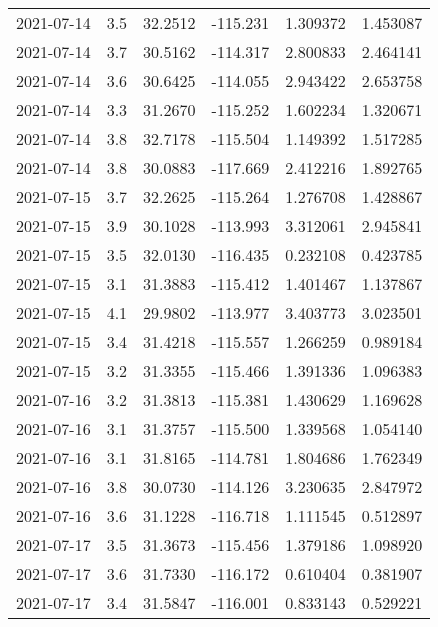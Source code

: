 \begin{tabular}{lrrrrr}
2021-07-14 &       3.5 &  32.2512 &  -115.231 &         1.309372 &         1.453087 \\
2021-07-14 &       3.7 &  30.5162 &  -114.317 &         2.800833 &         2.464141 \\
2021-07-14 &       3.6 &  30.6425 &  -114.055 &         2.943422 &         2.653758 \\
2021-07-14 &       3.3 &  31.2670 &  -115.252 &         1.602234 &         1.320671 \\
2021-07-14 &       3.8 &  32.7178 &  -115.504 &         1.149392 &         1.517285 \\
2021-07-14 &       3.8 &  30.0883 &  -117.669 &         2.412216 &         1.892765 \\
2021-07-15 &       3.7 &  32.2625 &  -115.264 &         1.276708 &         1.428867 \\
2021-07-15 &       3.9 &  30.1028 &  -113.993 &         3.312061 &         2.945841 \\
2021-07-15 &       3.5 &  32.0130 &  -116.435 &         0.232108 &         0.423785 \\
2021-07-15 &       3.1 &  31.3883 &  -115.412 &         1.401467 &         1.137867 \\
2021-07-15 &       4.1 &  29.9802 &  -113.977 &         3.403773 &         3.023501 \\
2021-07-15 &       3.4 &  31.4218 &  -115.557 &         1.266259 &         0.989184 \\
2021-07-15 &       3.2 &  31.3355 &  -115.466 &         1.391336 &         1.096383 \\
2021-07-16 &       3.2 &  31.3813 &  -115.381 &         1.430629 &         1.169628 \\
2021-07-16 &       3.1 &  31.3757 &  -115.500 &         1.339568 &         1.054140 \\
2021-07-16 &       3.1 &  31.8165 &  -114.781 &         1.804686 &         1.762349 \\
2021-07-16 &       3.8 &  30.0730 &  -114.126 &         3.230635 &         2.847972 \\
2021-07-16 &       3.6 &  31.1228 &  -116.718 &         1.111545 &         0.512897 \\
2021-07-17 &       3.5 &  31.3673 &  -115.456 &         1.379186 &         1.098920 \\
2021-07-17 &       3.6 &  31.7330 &  -116.172 &         0.610404 &         0.381907 \\
2021-07-17 &       3.4 &  31.5847 &  -116.001 &         0.833143 &         0.529221 \\

\end{tabular}
